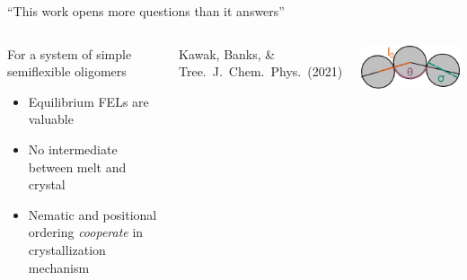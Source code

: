 \documentclass[aspectratio=169]{beamer}
\begin{document}
\begin{frame}[c]{``This work opens more questions than it answers''}

  \vspace{-1\baselineskip}
  \begin{columns}[T, onlytextwidth]


    \centering
    \vspace{0.5\baselineskip}
    \begin{block}{For a system of simple semiflexible oligomers}
      \begin{itemize}
      \item Equilibrium FELs are valuable
      \item No intermediate between melt and crystal
      \item Nematic and positional ordering \emph{cooperate} in crystallization mechanism
    \end{itemize}
    \end{block}

    {\small{}Kawak, Banks, \& Tree.~J.~Chem.~Phys.~(2021)\par}
  \vspace{0.6\baselineskip}


  \vspace{0.8\baselineskip}
    \centering
    \includegraphics[]{figs/fig-stiff_PE_single.pdf}


\end{columns}
\end{frame}
\end{document}
